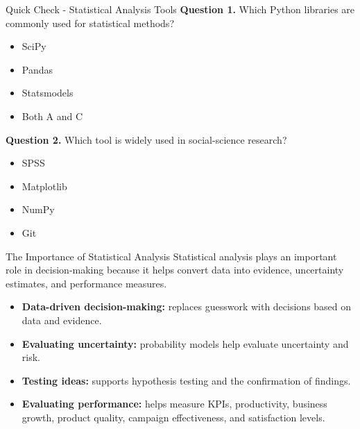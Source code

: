 \documentclass[aspectratio=169,11pt]{beamer}
\begin{document}
\begin{frame}[allowframebreaks]{Quick Check - Statistical Analysis Tools}
\footnotesize
\textbf{Question 1.} Which Python libraries are commonly used for statistical methods?\par\medskip
\begin{itemize}
\item[\textbf{A.}] SciPy
\item[\textbf{B.}] Pandas
\item[\textbf{C.}] Statsmodels
\item[\textbf{D.}] Both A and C
\end{itemize}
\textbf{Question 2.} Which tool is widely used in social-science research?\par\medskip
\begin{itemize}
\item[\textbf{A.}] SPSS
\item[\textbf{B.}] Matplotlib
\item[\textbf{C.}] NumPy
\item[\textbf{D.}] Git
\end{itemize}
\end{frame}

\begin{frame}[allowframebreaks]{The Importance of Statistical Analysis}
\small
Statistical analysis plays an important role in decision-making because it helps convert data into evidence, uncertainty estimates, and performance measures.\par\medskip
\begin{itemize}
\item \textbf{Data-driven decision-making:} replaces guesswork with decisions based on data and evidence.
\item \textbf{Evaluating uncertainty:} probability models help evaluate uncertainty and risk.
\item \textbf{Testing ideas:} supports hypothesis testing and the confirmation of findings.
\item \textbf{Evaluating performance:} helps measure KPIs, productivity, business growth, product quality, campaign effectiveness, and satisfaction levels.
\end{itemize}
\end{frame}
\end{document}
